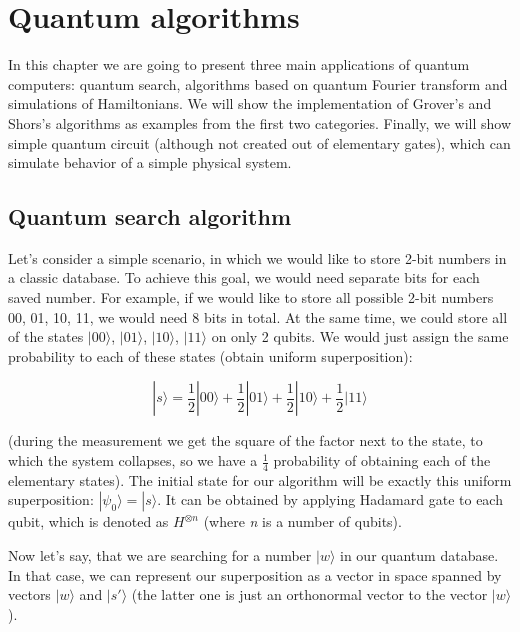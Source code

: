 \chapter{Quantum algorithms}
\thispagestyle{chapterBeginStyle}
\label{chapter3}

In this chapter we are going to present three main applications of quantum computers: quantum search, algorithms based on quantum Fourier transform and simulations of Hamiltonians. We will show the implementation of Grover's and Shors's algorithms as examples from the first two categories. Finally, we will show simple quantum circuit (although not created out of elementary gates), which can simulate behavior of a simple physical system.

\section{Quantum search algorithm}\label{quantum_search_algorithm}

Let's consider a simple scenario, in which we would like to store 2-bit numbers in a classic database. To achieve this goal, we would need separate bits for each saved number. For example, if we would like to store all possible 2-bit numbers 00, 01, 10, 11, we would need 8 bits in total. At the same time, we could store all of the states $|00\rangle$, $|01\rangle$, $|10\rangle$, $|11\rangle$ on only 2 qubits. We would just assign the same probability to each of these states (obtain uniform superposition):

\[ |s\rangle = \frac{1}{2}|00\rangle + \frac{1}{2}|01\rangle + \frac{1}{2}|10\rangle + \frac{1}{2}|11\rangle\]

(during the measurement we get the square of the factor next to the state, to which the system collapses, so we have a $\frac{1}{4}$ probability of obtaining each of the elementary states). The initial state for our algorithm will be exactly this uniform superposition: $|\psi_0\rangle = |s\rangle$. It can be obtained by applying Hadamard gate to each qubit, which is denoted as $H^{\otimes n}$ (where \textit{n} is a number of qubits).

Now let's say, that we are searching for a number $|w\rangle$ in our quantum database. In that case, we can represent our superposition as a vector in space spanned by vectors $|w\rangle$ and $|s'\rangle$ (the latter one is just an orthonormal vector to the vector $|w\rangle$).

